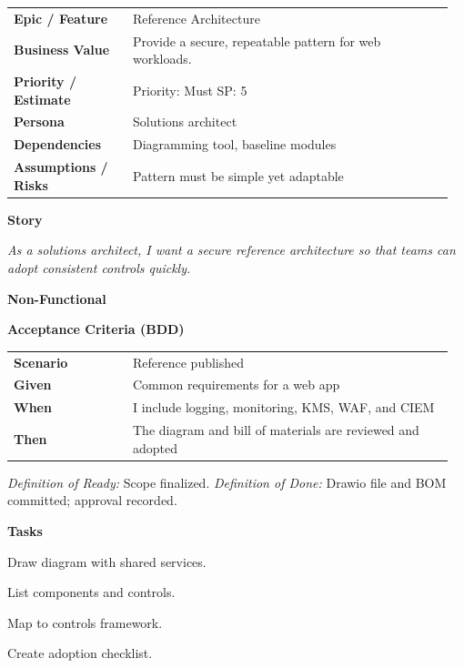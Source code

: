 \documentclass[11pt,letterpaper]{article}
\makeatletter
\newenvironment{kvtable}{%
  \par\noindent\begin{tabular}{@{}>{\raggedright\bfseries\arraybackslash}p{0.26\linewidth} >{\raggedright\arraybackslash}p{0.70\linewidth}@{}}
}{\end{tabular}\par}
\newenvironment{bdd}{%
  \par\noindent\begin{tabular}{@{}>{\raggedright\bfseries\arraybackslash}p{0.26\linewidth} >{\raggedright\arraybackslash}p{0.70\linewidth}@{}}
}{\end{tabular}\par}
\newcommand{\DoRDoD}[2]{%
  \vspace{0.35em}
  {\footnotesize\color{Muted}%
    \textit{Definition of Ready:} #1 \; \textbullet\;
    \textit{Definition of Done:} #2%
  }%
}
\newenvironment{storycard}[2]{%
  \begin{tcolorbox}[cloudcard, title={#1 --- #2}]%
}{\end{tcolorbox}}
\newcommand{\sectionlabel}[1]{\par\vspace{0.35em}\textbf{#1}\par}
\makeatother
\begin{document}
\begin{storycard}{CCS-14}{Ch. 14 — Security Essentials \& Reference Architectures}
\begin{kvtable}
Epic / Feature & Reference Architecture\\
Business Value & Provide a secure, repeatable pattern for web workloads.\\
Priority / Estimate & Priority: Must \quad SP: 5\\
Persona & Solutions architect\\
Dependencies & Diagramming tool, baseline modules\\
Assumptions / Risks & Pattern must be simple yet adaptable\\
\end{kvtable}
\sectionlabel{Story}
\textit{As a solutions architect, I want a secure reference architecture so that teams can adopt consistent controls quickly.}
\sectionlabel{Non-Functional}\;
\sectionlabel{Acceptance Criteria (BDD)}
\begin{bdd}
Scenario & Reference published\\
Given & Common requirements for a web app\\
When & I include logging, monitoring, KMS, WAF, and CIEM\\
Then & The diagram and bill of materials are reviewed and adopted\\
\end{bdd}
\DoRDoD{Scope finalized.}{Drawio file and BOM committed; approval recorded.}
\sectionlabel{Tasks}
\begin{checklist}
\item Draw diagram with shared services.
\item List components and controls.
\item Map to controls framework.
\item Create adoption checklist.
\end{checklist}
\end{storycard}
\end{document}
